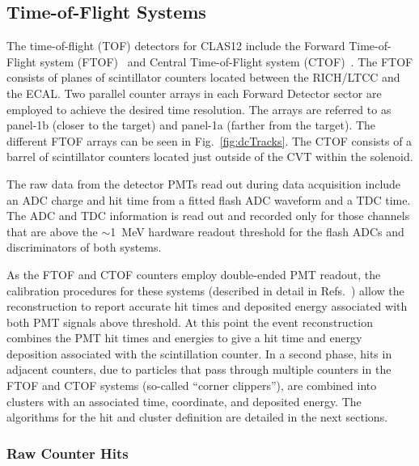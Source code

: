 \subsection{Time-of-Flight Systems}
\label{tof-sys}

The time-of-flight (TOF) detectors for CLAS12 include the Forward Time-of-Flight system (FTOF)~\cite{ftof-nim}
and Central Time-of-Flight system (CTOF)~\cite{ctof-nim}. The FTOF consists of planes of scintillator counters
located between the RICH/LTCC and the ECAL. Two parallel counter arrays in each Forward Detector sector are
employed to achieve the desired time resolution. The arrays are referred to as panel-1b (closer to the target) and
panel-1a (farther from the target). The different FTOF arrays can be seen in Fig.~\ref{fig:dcTracks}. The CTOF
consists of a barrel of scintillator counters located just outside of the CVT within the solenoid.

The raw data from the detector PMTs read out during data acquisition include an ADC charge and hit time from a
fitted flash ADC waveform and a TDC time. The ADC and TDC information is read out and recorded only for those
channels that are above the $\sim$1~MeV hardware readout threshold for the flash ADCs and discriminators of
both systems. 

As the FTOF and CTOF counters employ double-ended PMT readout, the calibration procedures for these
systems (described in detail in Refs.~\cite{ftof-nim,ctof-nim}) allow the reconstruction to report accurate hit
times and deposited energy associated with both PMT signals above threshold. At this point the event reconstruction
combines the PMT hit times and energies to give a hit time and energy deposition associated with the scintillation
counter. In a second phase, hits in adjacent counters, due to particles that pass through multiple counters in the
FTOF and CTOF systems (so-called ``corner clippers''), are combined into clusters with an associated time,
coordinate, and deposited energy. The algorithms for the hit and cluster definition are detailed in the next sections.

\subsubsection{Raw Counter Hits}

